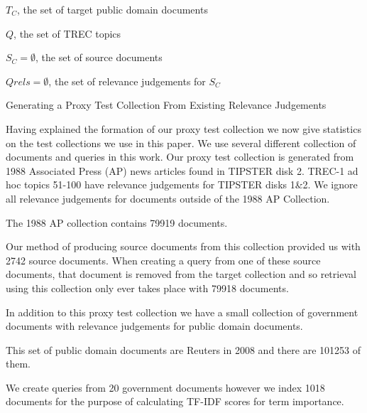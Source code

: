 \documentclass{mpaper}
\begin{document}
\begin{algorithm}
\SetAlgoLined
{}
 $T_C$, the set of target public domain documents
 
 $ Q $, the set of TREC topics
 
 $S_C = \emptyset$, the set of source documents
 
 $Qrels = \emptyset $, the set of relevance judgements for $S_C$
 
 \caption{Generating a Proxy Test Collection From Existing Relevance Judgements}
 \label{alg:prox}
\end{algorithm}

Having explained the formation of our proxy test collection we now give statistics on the test collections we use in this paper.
We use several different collection of documents and queries in this work.
Our proxy test collection is generated from 1988 Associated Press (AP) news articles found in TIPSTER disk 2.
TREC-1 ad hoc topics 51-100 have relevance judgements for  TIPSTER disks 1\&2. We ignore all relevance judgements for documents outside of the 1988 AP Collection.

The 1988 AP collection contains 79919 documents.

Our method of producing source documents from this collection provided us with 2742 source documents.
When creating a query from one of these source documents, that document is removed from the target collection and so retrieval using this collection only ever takes place with 79918 documents.

In addition to this proxy test collection we have a small collection of government documents with relevance judgements for public domain documents.

This set of public domain documents are Reuters in 2008 and there are 101253 of them.

We create queries from 20 government documents however we index 1018 documents for the purpose of calculating TF-IDF scores for term importance.
\end{document}
